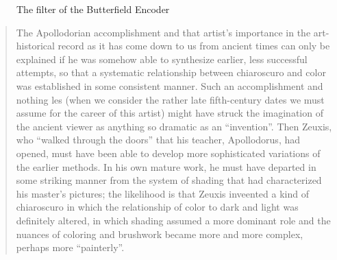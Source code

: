 \begin{figure}[ht]
    \begin{center}
    \end{center}
    \caption{The filter of the Butterfield Encoder}
    \label{fig:3}
\end{figure}


\begin{quote}
    The Apollodorian accomplishment and that artist's importance in the art-historical record as it has come down to us from ancient times can only be explained if he was somehow able to synthesize earlier, less successful attempts, so that a systematic relationship between chiaroscuro and color was established in some consistent manner. Such an accomplishment and nothing les (when we consider the rather late fifth-century dates we must assume for the career of this artist) might have struck the imagination of the ancient viewer as anything so dramatic as an ``invention''. Then Zeuxis, who ``walked through the doors'' that his teacher, Apollodorus, had opened, must have been able to develop more sophisticated variations of the earlier methods. In his own mature work, he must have departed in some striking manner from the system of shading that had characterized his master's pictures; the likelihood is that Zeuxis inveented a kind of chiaroscuro in which the relationship of color to dark and light was definitely altered, in which shading assumed a more dominant role and the nuances of coloring and brushwork became more and more complex, perhaps more ``painterly''. \citep[29]{Bruno:1977fk}
\end{quote}


